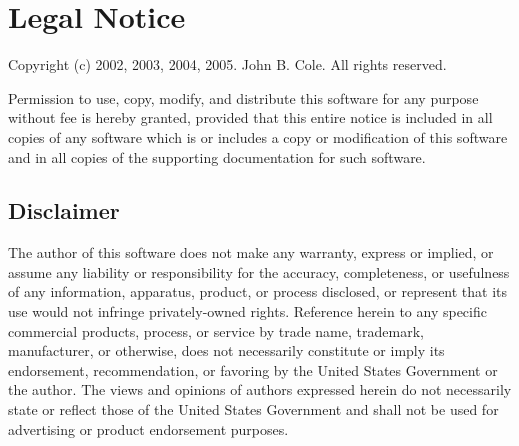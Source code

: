 \section*{Legal Notice}
\label{sec:legal-notice}

Copyright (c) 2002, 2003, 2004, 2005.  John B. Cole.  All rights reserved.

Permission to use, copy, modify, and distribute this software for any purpose
without fee is hereby granted, provided that this entire notice is included in
all copies of any software which is or includes a copy or modification of this
software and in all copies of the supporting documentation for such software.

\subsection*{Disclaimer}

The author of this software does not make any warranty, express or implied, or
assume any liability or responsibility for the accuracy, completeness, or
usefulness of any information, apparatus, product, or process disclosed, or
represent that its use would not infringe privately-owned rights. Reference
herein to any specific commercial products, process, or service by trade name,
trademark, manufacturer, or otherwise, does not necessarily constitute or imply
its endorsement, recommendation, or favoring by the United States Government or
the author. The views and opinions of authors expressed herein do not necessarily
state or reflect those of the United States Government and shall not be used for
advertising or product endorsement purposes.

